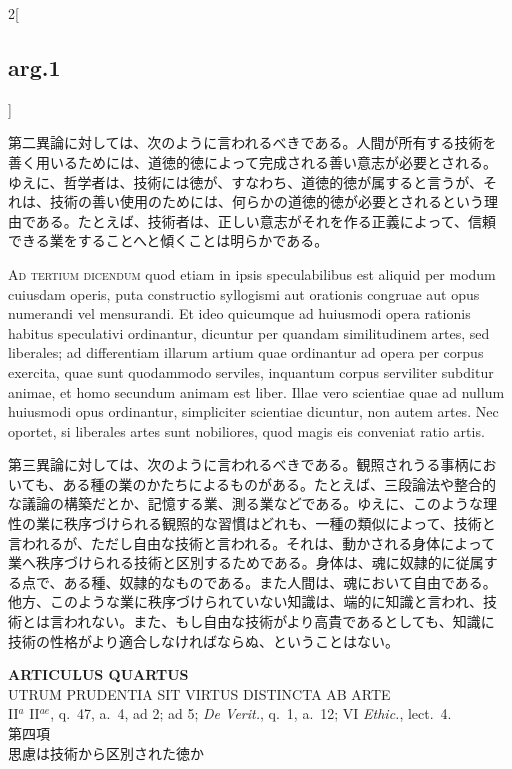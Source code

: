 \documentclass[paper=a4paper,fontsize=10pt,jafontsize=9pt,titlepage]{jlreq}
\begin{document}
\begin{paracol}{2}[\subsection{arg.1}]
\switchcolumn

第二異論に対しては、次のように言われるべきである。人間が所有する技術を
善く用いるためには、道徳的徳によって完成される善い意志が必要とされる。
ゆえに、哲学者は、技術には徳が、すなわち、道徳的徳が属すると言うが、そ
れは、技術の善い使用のためには、何らかの道徳的徳が必要とされるという理
由である。たとえば、技術者は、正しい意志がそれを作る正義によって、信頼
できる業をすることへと傾くことは明らかである。

\switchcolumn*[\subsection{ad.3}]

{\scshape Ad tertium dicendum} quod etiam in ipsis speculabilibus est
aliquid per modum cuiusdam operis, puta constructio syllogismi aut
orationis congruae aut opus numerandi vel mensurandi. Et ideo
quicumque ad huiusmodi opera rationis habitus speculativi ordinantur,
dicuntur per quandam similitudinem artes, sed liberales; ad
differentiam illarum artium quae ordinantur ad opera per corpus
exercita, quae sunt quodammodo serviles, inquantum corpus serviliter
subditur animae, et homo secundum animam est liber. Illae vero
scientiae quae ad nullum huiusmodi opus ordinantur, simpliciter
scientiae dicuntur, non autem artes. Nec oportet, si liberales artes
sunt nobiliores, quod magis eis conveniat ratio artis.

\switchcolumn

第三異論に対しては、次のように言われるべきである。観照されうる事柄にお
いても、ある種の業のかたちによるものがある。たとえば、三段論法や整合的
な議論の構築だとか、記憶する業、測る業などである。ゆえに、このような理
性の業に秩序づけられる観照的な習慣はどれも、一種の類似によって、技術と
言われるが、ただし自由な技術と言われる。それは、動かされる身体によって
業へ秩序づけられる技術と区別するためである。身体は、魂に奴隷的に従属す
る点で、ある種、奴隷的なものである。また人間は、魂において自由である。
他方、このような業に秩序づけられていない知識は、端的に知識と言われ、技
術とは言われない。また、もし自由な技術がより高貴であるとしても、知識に
技術の性格がより適合しなければならぬ、ということはない。

\end{paracol}
\newpage

{}
\setcounter{section}{4}
\setcounter{subsection}{0}
\begin{center}
 {\Large {\bfseries ARTICULUS QUARTUS}}\\ {\large UTRUM PRUDENTIA SIT VIRTUS
 DISTINCTA AB ARTE}\\ {\footnotesize II$^a$ II$^{ae}$, q.~47, a.~4, ad
 2; ad 5; {\itshape De Verit.}, q.~1, a.~12; VI {\itshape Ethic.},
 lect.~4.}\\ {\Large 第四項\\思慮は技術から区別された徳か}
\end{center}
\end{document}
